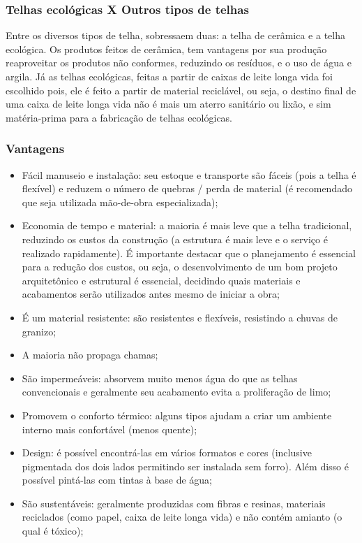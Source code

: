 \subsubsection*{\textbf{Telhas ecológicas X Outros tipos de telhas}}
Entre os diversos tipos de telha, sobressaem duas: a telha de cerâmica e a telha ecológica. Os produtos feitos de cerâmica, tem vantagens por sua produção reaproveitar os produtos não conformes, reduzindo os resíduos, e o uso de água e argila. Já as telhas ecológicas, feitas a partir de caixas de leite longa vida foi escolhido pois, ele é feito a partir de material reciclável, ou seja, o destino final de uma caixa de leite longa vida não é mais um aterro sanitário ou lixão, e sim matéria-prima para a fabricação de telhas ecológicas.



\subsubsection*{\textbf{Vantagens}}

	\begin{itemize}

		\item Fácil manuseio e instalação: seu estoque e transporte são fáceis (pois a telha é flexível) e reduzem o número de quebras / perda de material (é recomendado que seja utilizada mão-de-obra especializada);
		\item Economia de tempo e material: a maioria é mais leve que a telha tradicional, reduzindo os custos da construção (a estrutura é mais leve e o serviço é realizado rapidamente). É importante destacar que o planejamento é essencial para a redução dos custos, ou seja, o desenvolvimento de um bom projeto arquitetônico e estrutural é essencial, decidindo quais materiais e acabamentos serão utilizados antes mesmo de iniciar a obra;
		\item É um material resistente: são resistentes e flexíveis, resistindo a chuvas de granizo;
		\item A maioria não propaga chamas;
		\item São impermeáveis: absorvem muito menos água do que as telhas convencionais e geralmente seu acabamento evita a proliferação de limo;
		\item Promovem o conforto térmico: alguns tipos ajudam a criar um ambiente interno mais confortável (menos quente);
		\item Design: é possível encontrá-las em vários formatos e cores (inclusive pigmentada dos dois lados permitindo ser instalada sem forro). Além disso é possível pintá-las com tintas à base de água;
		\item São sustentáveis: geralmente produzidas com fibras e resinas, materiais reciclados (como papel, caixa de leite longa vida) e não contém amianto (o qual é tóxico);
	
	\end{itemize}

